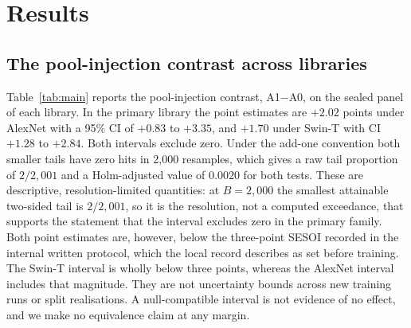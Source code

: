 \section{Results}\label{sec:results}

\subsection{The pool-injection contrast across libraries}

Table~\ref{tab:main} reports the pool-injection contrast, A1$-$A0, on the sealed panel of each library.
In the primary library the point estimates are $+2.02$ points under
AlexNet with a 95\% CI of $+0.83$ to $+3.35$, and $+1.70$ under Swin-T with CI $+1.28$ to
$+2.84$. Both intervals
exclude zero. Under the add-one convention both smaller tails have zero hits in 2{,}000
resamples, which gives a raw tail proportion of $2/2{,}001$ and a Holm-adjusted value of
$0.0020$ for both tests. These are descriptive, resolution-limited quantities: at $B=2{,}000$
the smallest attainable two-sided tail is $2/2{,}001$, so it is the resolution, not a computed
exceedance, that supports the statement that the interval excludes zero in the primary family.
Both point estimates are, however, below the three-point SESOI recorded in the internal written
protocol, which the local record describes as set before training. The Swin-T interval is wholly below three points, whereas the AlexNet interval includes
that magnitude. They are not uncertainty bounds across new training runs or split realisations.
A null-compatible interval is not evidence of no effect, and we make no equivalence claim at any margin.

